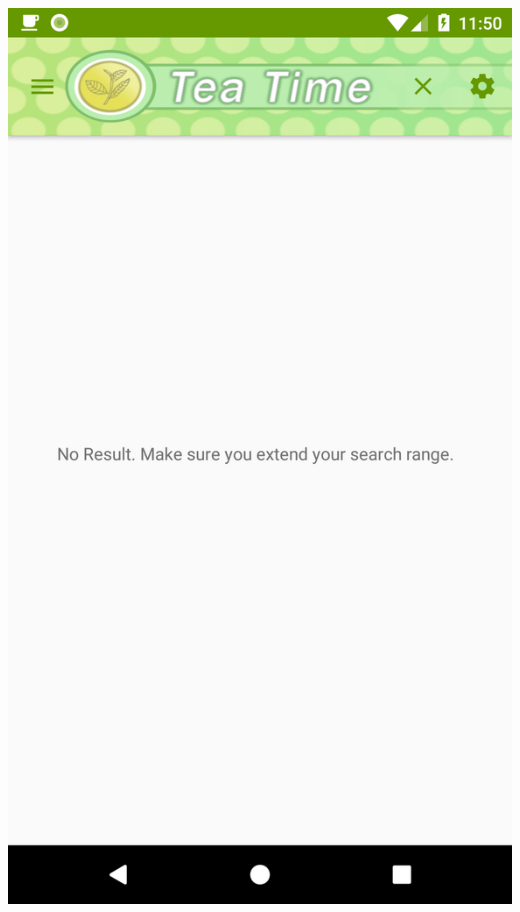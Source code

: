 \documentclass[a4paper,12pt]{article}
\begin{document}
\begin{spacing}{1}
	\includegraphics*[scale=0.1]{Screenshot/20.png}    

\end{spacing}
\end{document}
